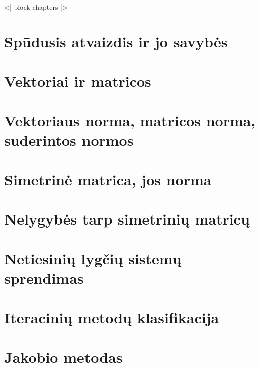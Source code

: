 <| block chapters |>
\newcommand{\cinput}[1]{}

\cinput{01.tex}   %
\cinput{02.tex}   %
\cinput{03.tex}   %
\cinput{04.tex}   %
\cinput{05.tex}   %
\cinput{06.tex}   %

\section{Spūdusis atvaizdis ir jo savybės}
\cite[43-44]{textbook}
\section{Vektoriai ir matricos}
\section{Vektoriaus norma, matricos norma, suderintos normos}
\cite[43-44]{textbook}
\cite[104]{textbook}
\section{Simetrinė matrica, jos norma}
\section{Nelygybės tarp simetrinių matricų}
\cite[99]{textbook}
\section{Netiesinių lygčių sistemų sprendimas}
\cite[43-48]{textbook}

\section{Iteracinių metodų klasifikacija}
\cite[104]{textbook}
\section{Jakobio metodas}
\cite[88-93]{textbook}
